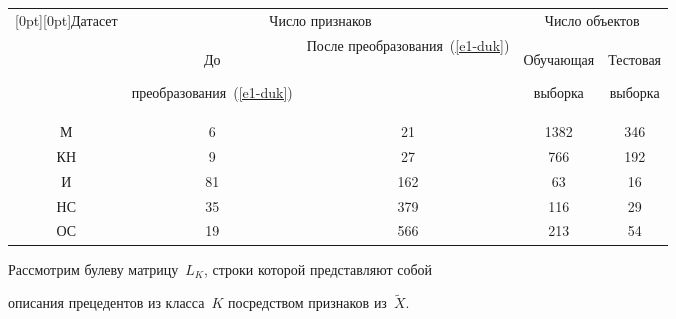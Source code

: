 \begin{multicols}{2}
\begin{table}[b]\small %


\vspace*{-15pt}


\begin{center}




\vspace*{2ex}





\begin{tabular}{|c|c|c|c|c|}


\hline


\multicolumn{1}{|c|}{\raisebox{-6pt}[0pt][0pt]{Датасет}}&\multicolumn{2}{c|}{Число признаков}&\multicolumn{2}{c|}{Число объектов}\\


\cline{2-5}


&До 


преобразования~(\ref{e1-duk})&После преобразования~(\ref{e1-duk})&Обучающая


выборка&Тестовая 


выборка\\


\hline


М&\hphantom{9}6&\hphantom{9}21&1382\hphantom{9}&346\hphantom{9}\\


КН&\hphantom{9}9&\hphantom{9}27&766&192\hphantom{9}\\


И&81&162&\hphantom{9}63&16\\


НС&35&379&116&29\\


ОС&19&566&213&54\\


\hline


\end{tabular}


\end{center}


\end{table}





    


    Рассмотрим булеву матрицу~$L_K$, строки которой представляют собой 


описания прецедентов из класса~$K$ посредством признаков из~$\tilde{X}$. 



\end{multicols}
